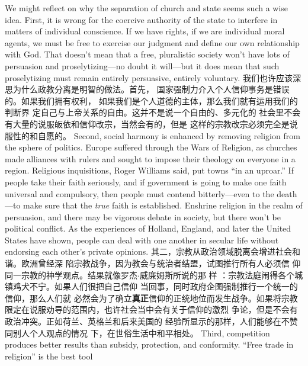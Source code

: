 \begin{paracol}{2}
We might reflect on why the separation of church and state
seems such a wise idea. First, it is wrong for the coercive authority of the state to interfere in matters of individual conscience. If we have rights, if we are individual moral agents, we
must be free to exercise our judgment and define our own relationship with God. That doesn't mean that a free, pluralistic society won't have lots of persuasion and proselytizing---no doubt
it will---but it does mean that such proselytizing must remain
entirely persuasive, entirely voluntary.
\switchcolumn
我们也许应该深思为什么政教分离是明智的做法。首先，
国家强制力介入个人信仰事务是错误的。如果我们拥有权利，
如果我们是个人道德的主体，那么我们就有运用我们的判断界
定自己与上帝关系的自由。这并不是说一个自由的、多元化的
社会里不会有大量的说服皈依和信仰改宗，当然会有的，但是
这样的宗教改宗必须完全是说服性的和自愿的。
\switchcolumn*
Second, social harmony is enhanced by removing religion
from the sphere of politics. Europe suffered through the Wars of
Religion, as churches made alliances with rulers and sought to
impose their theology on everyone in a region. Religious inquisitions, Roger Williams said, put towns ``in an uproar.'' If people
take their faith seriously, and if government is going to make
one faith universal and compulsory, then people must contend
bitterly---even to the death---to make sure that the \textit{true} faith is
established. Enshrine religion in the realm of persuasion, and
there may be vigorous debate in society, but there won't be political conflict. As the experiences of Holland, England, and
later the United States have shown, people can deal with one
another in secular life without endorsing each other's private
opinions.
\switchcolumn
其二，宗教从政治领域脱离会增进社会和谐。欧洲曾经深
陷宗教战争，因为教会与统治者结盟，试图推行所有人必须信
仰同一宗教的神学观点。结果就像罗杰$\cdot$威廉姆斯所说的那
样 ：宗教法庭闹得各个城镇鸡犬不宁。如果人们很把自己信仰
当回事，同时政府企图强制推行一个统一的信仰，那么人们就
必然会为了确立\textbf{真正}信仰的正统地位而发生战争。如果将宗教
限定在说服劝导的范围内，也许社会当中会有关于信仰的激烈
争论，但是不会有政治冲突。正如荷兰、英格兰和后来美国的
经验所显示的那样，人们能够在不赞同别人个人观点的情况
下，在世俗生活中和平相处。
\switchcolumn*
Third, competition produces better results than subsidy, protection, and conformity. ``Free trade in religion'' is the best tool

\end{paracol}
